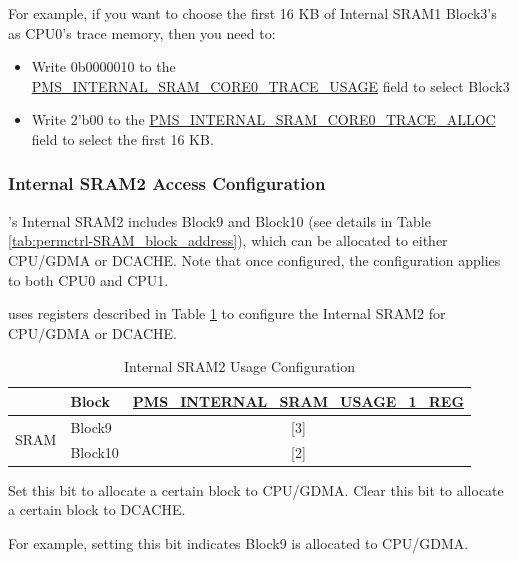 \documentclass[main\_\_EN.tex]{subfiles}
\begin{document}
For example, if you want to choose the first 16 KB of Internal SRAM1 Block3's as CPU0's trace memory, then you need to:
\begin{itemize}
    \item Write 0b0000010 to the \hyperref[fielddesc:PMSINTERNALSRAMCORE0TRACEUSAGE]{PMS\_INTERNAL\_SRAM\_CORE0\_TRACE\_USAGE} field to select Block3
    \item Write 2'b00 to the \hyperref[fielddesc:PMSINTERNALSRAMCORE0TRACEALLOC]{PMS\_INTERNAL\_SRAM\_CORE0\_TRACE\_ALLOC} field to select the first 16 KB.
\end{itemize}

\subsubsection{Internal SRAM2  Access Configuration}\label{sec:permctrl_sram2}

\chipname{}'s Internal SRAM2 includes Block9 and Block10 (see details in Table \ref{tab:permctrl-SRAM_block_address}), which can be allocated to either CPU/GDMA or DCACHE. Note that once configured, the configuration applies to both CPU0 and CPU1.

\chipname{} uses registers described in Table \ref{tab:permctrl-sram2_accessconfig} to configure the Internal SRAM2 for CPU/GDMA or DCACHE.

\begin{table}[H]
    \centering
    \caption{Internal SRAM2 Usage Configuration}
    \label{tab:permctrl-sram2_accessconfig}
    \begin{threeparttable}
    \begin{tabular}{|l|l|c|}
    \hline
    \rowcolor{lightgray}
                          &\textbf{Block}  & \textbf{\hyperref[regdesc:PMSINTERNALSRAMUSAGE1REG]{PMS\_INTERNAL\_SRAM\_USAGE\_1\_REG}\tnote{A}}\\\hline
    \multirow{2}{*}{SRAM} & Block9\tnote{B}        & [3] \\\cline{2-3}
                          & Block10        & [2] \\\hline
    \end{tabular}
        \begin{tablenotes}
        \item[A] Set this bit to allocate a certain block to CPU/GDMA. Clear this bit to allocate a certain block to DCACHE.
        \item[B] For example, setting this bit indicates Block9 is allocated to CPU/GDMA.
        \end{tablenotes}
    \end{threeparttable}
\end{table}
\end{document}
